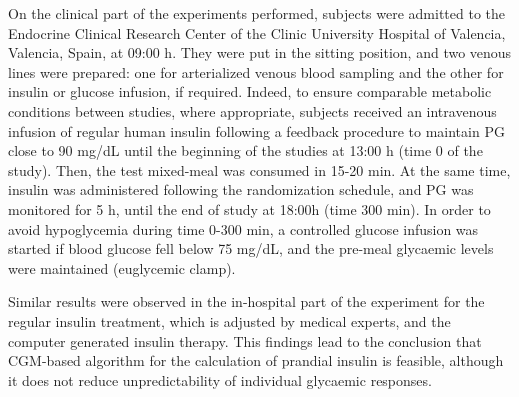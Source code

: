 On the clinical part of the experiments performed, subjects were admitted to the Endocrine Clinical Research Center of the Clinic University Hospital of Valencia, Valencia, Spain, at 09:00 h. They were put in the sitting position, and two venous lines were prepared: one for arterialized venous blood sampling and the other for insulin or glucose infusion, if required. Indeed, to ensure comparable metabolic conditions between studies, where appropriate, subjects received an intravenous infusion of regular human insulin following a feedback procedure to maintain PG close to 90 mg/dL until the beginning of the studies at 13:00 h (time 0 of the study). Then, the test mixed-meal was consumed in 15-20 min. At the same time, insulin was administered following the randomization schedule, and PG was monitored for 5 h, until the end of study at 18:00h (time 300 min). In order to avoid hypoglycemia during time 0-300 min, a controlled glucose infusion was started if blood glucose fell below 75 mg/dL, and the pre-meal glycaemic levels were maintained (euglycemic clamp). 

Similar results were observed in the in-hospital part of the experiment for the regular insulin treatment, which is adjusted by medical experts, and the computer generated insulin therapy. This findings lead to the conclusion that CGM-based algorithm for the calculation of prandial insulin is feasible, although it does not reduce unpredictability of individual glycaemic responses.




